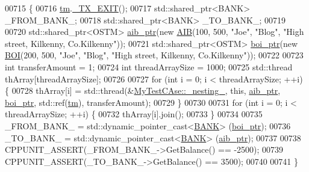 \begin{DoxyCode}
00715                                                      \{
00716     \hyperlink{class_my_test_c_ase_a422e6e5d4ddedea384be96031c89b72b_a422e6e5d4ddedea384be96031c89b72b}{tm}.\hyperlink{class_t_m_a5e2d1127f2429f2f524d25f430eade06_a5e2d1127f2429f2f524d25f430eade06}{\_TX\_EXIT}();
00717     std::shared\_ptr<BANK> \_FROM\_BANK\_;
00718     std::shared\_ptr<BANK> \_TO\_BANK\_;
00719     
00720     std::shared\_ptr<OSTM> \hyperlink{class_my_test_c_ase_adad50e8278b64aa0321000b528e5362c_adad50e8278b64aa0321000b528e5362c}{aib\_ptr}(\textcolor{keyword}{new} \hyperlink{class_a_i_b}{AIB}(100, 500, \textcolor{stringliteral}{"Joe"}, \textcolor{stringliteral}{"Blog"}, \textcolor{stringliteral}{"High street, Kilkenny,
       Co.Kilkenny"}));
00721     std::shared\_ptr<OSTM> \hyperlink{class_my_test_c_ase_a5554de9e3e6393a89c66c036c529720b_a5554de9e3e6393a89c66c036c529720b}{boi\_ptr}(\textcolor{keyword}{new} \hyperlink{class_b_o_i}{BOI}(200, 500, \textcolor{stringliteral}{"Joe"}, \textcolor{stringliteral}{"Blog"}, \textcolor{stringliteral}{"High street, Kilkenny,
       Co.Kilkenny"}));
00722     
00723     \textcolor{keywordtype}{int} transferAmount = 1;
00724     \textcolor{keywordtype}{int} threadArraySize = 1000; 
00725     std::thread thArray[threadArraySize];
00726 
00727     \textcolor{keywordflow}{for} (\textcolor{keywordtype}{int} i = 0; i < threadArraySize; ++i) \{
00728         thArray[i] = std::thread(&\hyperlink{class_my_test_c_ase_abb973a1396c1083891d76845e2cfaf64_abb973a1396c1083891d76845e2cfaf64}{MyTestCAse::\_nesting\_}, \textcolor{keyword}{this}, 
      \hyperlink{class_my_test_c_ase_adad50e8278b64aa0321000b528e5362c_adad50e8278b64aa0321000b528e5362c}{aib\_ptr}, \hyperlink{class_my_test_c_ase_a5554de9e3e6393a89c66c036c529720b_a5554de9e3e6393a89c66c036c529720b}{boi\_ptr}, std::ref(\hyperlink{class_my_test_c_ase_a422e6e5d4ddedea384be96031c89b72b_a422e6e5d4ddedea384be96031c89b72b}{tm}), transferAmount);
00729     \}
00730     
00731     \textcolor{keywordflow}{for} (\textcolor{keywordtype}{int} i = 0; i < threadArraySize; ++i) \{
00732         thArray[i].join();
00733     \}
00734     
00735     \_FROM\_BANK\_ = std::dynamic\_pointer\_cast<\hyperlink{class_b_a_n_k}{BANK}> (\hyperlink{class_my_test_c_ase_a5554de9e3e6393a89c66c036c529720b_a5554de9e3e6393a89c66c036c529720b}{boi\_ptr});
00736     \_TO\_BANK\_ = std::dynamic\_pointer\_cast<\hyperlink{class_b_a_n_k}{BANK}> (\hyperlink{class_my_test_c_ase_adad50e8278b64aa0321000b528e5362c_adad50e8278b64aa0321000b528e5362c}{aib\_ptr});
00737     
00738     CPPUNIT\_ASSERT(\_FROM\_BANK\_->GetBalance() == -2500);
00739     CPPUNIT\_ASSERT(\_TO\_BANK\_->GetBalance() == 3500);
00740     
00741 \}
\end{DoxyCode}



